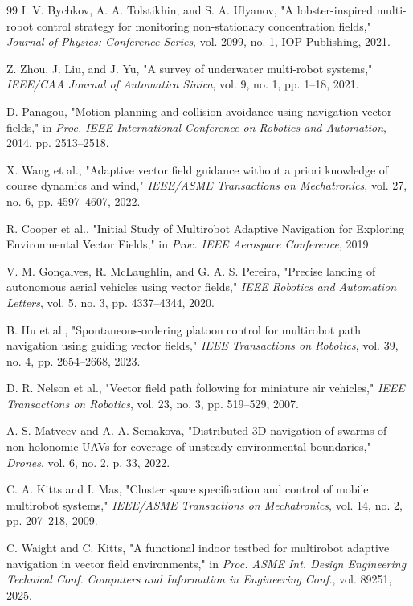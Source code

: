 \documentclass[lettersize,journal]{IEEEtran}
\begin{document}
\begin{thebibliography}{99}
 I. V. Bychkov, A. A. Tolstikhin, and S. A. Ulyanov, "A lobster-inspired multi-robot control strategy for monitoring non-stationary concentration fields," \textit{Journal of Physics: Conference Series}, vol. 2099, no. 1, IOP Publishing, 2021.

 Z. Zhou, J. Liu, and J. Yu, "A survey of underwater multi-robot systems," \textit{IEEE/CAA Journal of Automatica Sinica}, vol. 9, no. 1, pp. 1--18, 2021.

 D. Panagou, "Motion planning and collision avoidance using navigation vector fields," in \textit{Proc. IEEE International Conference on Robotics and Automation}, 2014, pp. 2513--2518.

 X. Wang et al., "Adaptive vector field guidance without a priori knowledge of course dynamics and wind," \textit{IEEE/ASME Transactions on Mechatronics}, vol. 27, no. 6, pp. 4597--4607, 2022.

 R. Cooper et al., "Initial Study of Multirobot Adaptive Navigation for Exploring Environmental Vector Fields," in \textit{Proc. IEEE Aerospace Conference}, 2019.

 V. M. Gonçalves, R. McLaughlin, and G. A. S. Pereira, "Precise landing of autonomous aerial vehicles using vector fields," \textit{IEEE Robotics and Automation Letters}, vol. 5, no. 3, pp. 4337--4344, 2020.

 B. Hu et al., "Spontaneous-ordering platoon control for multirobot path navigation using guiding vector fields," \textit{IEEE Transactions on Robotics}, vol. 39, no. 4, pp. 2654--2668, 2023.

 D. R. Nelson et al., "Vector field path following for miniature air vehicles," \textit{IEEE Transactions on Robotics}, vol. 23, no. 3, pp. 519--529, 2007.

 A. S. Matveev and A. A. Semakova, "Distributed 3D navigation of swarms of non-holonomic UAVs for coverage of unsteady environmental boundaries," \textit{Drones}, vol. 6, no. 2, p. 33, 2022.

 C. A. Kitts and I. Mas, "Cluster space specification and control of mobile multirobot systems," \textit{IEEE/ASME Transactions on Mechatronics}, vol. 14, no. 2, pp. 207--218, 2009.

 C. Waight and C. Kitts, "A functional indoor testbed for multirobot adaptive navigation in vector field environments," in \textit{Proc. ASME Int. Design Engineering Technical Conf. Computers and Information in Engineering Conf.}, vol. 89251, 2025.


\end{thebibliography}
\end{document}
